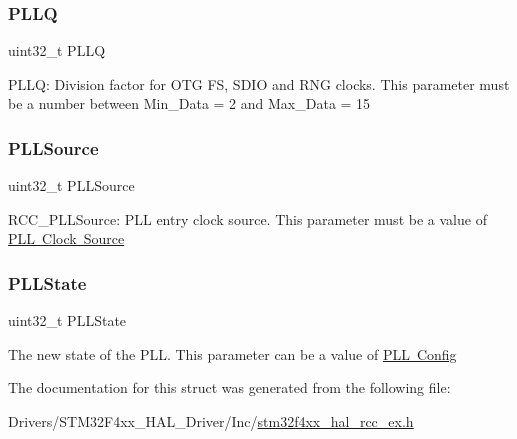 \subsubsection{\texorpdfstring{P\+L\+LQ}{PLLQ}}
{\footnotesize\ttfamily uint32\+\_\+t P\+L\+LQ}

P\+L\+LQ\+: Division factor for O\+TG FS, S\+D\+IO and R\+NG clocks. This parameter must be a number between Min\+\_\+\+Data = 2 and Max\+\_\+\+Data = 15 \mbox{\label{struct_r_c_c___p_l_l_init_type_def_a418ecda4a355c6a161e4893a7bc1897f}} 
\subsubsection{\texorpdfstring{P\+L\+L\+Source}{PLLSource}}
{\footnotesize\ttfamily uint32\+\_\+t P\+L\+L\+Source}

R\+C\+C\+\_\+\+P\+L\+L\+Source\+: P\+LL entry clock source. This parameter must be a value of \mbox{\hyperlink{group___r_c_c___p_l_l___clock___source}{P\+LL Clock Source}} \mbox{\label{struct_r_c_c___p_l_l_init_type_def_ab3bb33f461bb409576e1c899c962e0b0}} 
\subsubsection{\texorpdfstring{P\+L\+L\+State}{PLLState}}
{\footnotesize\ttfamily uint32\+\_\+t P\+L\+L\+State}

The new state of the P\+LL. This parameter can be a value of \mbox{\hyperlink{group___r_c_c___p_l_l___config}{P\+LL Config}} 

The documentation for this struct was generated from the following file\+:\begin{DoxyCompactItemize}
\item 
Drivers/\+S\+T\+M32\+F4xx\+\_\+\+H\+A\+L\+\_\+\+Driver/\+Inc/\mbox{\hyperlink{stm32f4xx__hal__rcc__ex_8h}{stm32f4xx\+\_\+hal\+\_\+rcc\+\_\+ex.\+h}}\end{DoxyCompactItemize}
